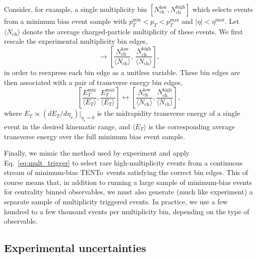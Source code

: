 \documentclass[aps,prc,reprint,amsmath,nofootinbib]{revtex4-1}
\newcommand{\trento}{T\raisebox{-0.5ex}{R}ENTo}
\newcommand{\nch}{N_\text{ch}}
\begin{document}
Consider, for example, a single multiplicity bin $[\nch^\text{low}, \nch^\text{high}]$ which selects events from a minimum bias event sample with $p_T^\text{min} < p_T < p_T^\text{max}$ and $|\eta| < \eta^\text{max}$.
Let $\langle\nch\rangle$ denote the average charged-particle multiplicity of these events.
We first rescale the experimental multiplicity bin edges,
\begin{equation}
  [\nch^\text{low}, \nch^\text{high}] \rightarrow \left[\frac{\nch^\text{low}}{\langle \nch \rangle},\, \frac{\nch^\text{high}}{\langle \nch \rangle}\right ],
\end{equation}
in order to reexpress each bin edge as a unitless variable.
These bin edges are then associated with a pair of transverse energy bin edges,
\begin{equation}
  \label{eq:mult_trigger}
  \left [\frac{E_T^\text{min}}{\langle E_T \rangle}, \frac{E_T^\text{max}}{\langle E_T \rangle} \right] \leftrightarrow \left [\frac{\nch^\text{low}}{\langle \nch \rangle}, \frac{\nch^\text{high}}{\langle \nch \rangle} \right ],
\end{equation}
where $E_T \propto (dE_T/d\eta_s) \vert_{\eta_s=0}$ is the midrapidity transverse energy of a single event in the desired kinematic range, and $\langle E_T \rangle$ is the corresponding average transverse energy over the full minimum bias event sample.

Finally, we mimic the method used by experiment and apply Eq.~\eqref{eq:mult_trigger} to select rare high-multiplicity events from a continuous stream of minimum-bias \trento\ events satisfying the correct bin edges.
This of course means that, in addition to running a large sample of minimum-bias events for centrality binned observables, we must also generate (much like experiment) a separate sample of multiplicity triggered events.
In practice, we use a few hundred to a few thousand events per multiplicity bin, depending on the type of observable.

\subsection{Experimental uncertainties}
\end{document}
